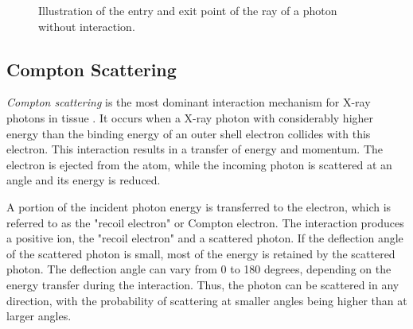 \begin{figure}[H]
    \centering
    \caption{Illustration of the entry and exit point of the ray of a photon without interaction.}
    \label{fig:exit_point}
\end{figure}


\subsection{Compton Scattering}
\label{sec:physicsComptonScattering}
\emph{Compton scattering} is the most dominant interaction mechanism for X-ray
photons in tissue \cite[Chapter 7]{medicalImagingSystemsIntro2019:}. It occurs
when a X-ray photon with considerably higher energy than the binding energy of
an outer shell electron collides with this electron. This interaction results in
a transfer of energy and momentum. The electron is ejected from the atom, while
the incoming photon is scattered at an angle and its energy is reduced.

A portion of the incident photon energy is transferred to the electron, which is
referred to as the "recoil electron" or Compton electron. The interaction
produces a positive ion, the "recoil electron" and a scattered photon. If the
deflection angle of the scattered photon is small, most of the energy is
retained by the scattered photon. The deflection angle can vary from 0 to 180
degrees, depending on the energy transfer during the interaction. Thus, the
photon can be scattered in any direction, with the probability of scattering at
smaller angles being higher than at larger angles.


